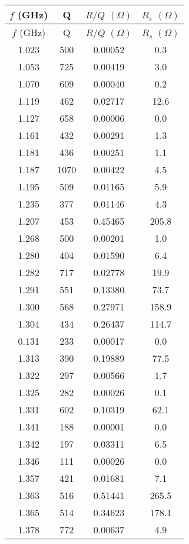 \begin{longtable}{c | c | c | c} 
\endfirsthead$f$ (GHz) & Q & $R/Q$ $(\Omega)$ & $R_{s}$ $(\Omega)$ \\
              \endhead$f$ (GHz) & Q & $R/Q$ $(\Omega)$ & $R_{s}$ $(\Omega)$ \\ \hline 
1.023 &  500 & 0.00052 &  0.3 \\ \hline 
1.053 &  725 & 0.00419 &  3.0 \\ \hline 
1.070 &  609 & 0.00040 &  0.2 \\ \hline 
1.119 &  462 & 0.02717 & 12.6 \\ \hline 
1.127 &  658 & 0.00006 &  0.0 \\ \hline 
1.161 &  432 & 0.00291 &  1.3 \\ \hline 
1.181 &  436 & 0.00251 &  1.1 \\ \hline 
1.187 & 1070 & 0.00422 &  4.5 \\ \hline 
1.195 &  509 & 0.01165 &  5.9 \\ \hline 
1.235 &  377 & 0.01146 &  4.3 \\ \hline 
1.207 &  453 & 0.45465 & 205.8 \\ \hline 
1.268 &  500 & 0.00201 &  1.0 \\ \hline 
1.280 &  404 & 0.01590 &  6.4 \\ \hline 
1.282 &  717 & 0.02778 & 19.9 \\ \hline 
1.291 &  551 & 0.13380 & 73.7 \\ \hline 
1.300 &  568 & 0.27971 & 158.9 \\ \hline 
1.304 &  434 & 0.26437 & 114.7 \\ \hline 
0.131 &  233 & 0.00017 &  0.0 \\ \hline 
1.313 &  390 & 0.19889 & 77.5 \\ \hline 
1.322 &  297 & 0.00566 &  1.7 \\ \hline 
1.325 &  282 & 0.00026 &  0.1 \\ \hline 
1.331 &  602 & 0.10319 & 62.1 \\ \hline 
1.341 &  188 & 0.00001 &  0.0 \\ \hline 
1.342 &  197 & 0.03311 &  6.5 \\ \hline 
1.346 &  111 & 0.00026 &  0.0 \\ \hline 
1.357 &  421 & 0.01681 &  7.1 \\ \hline 
1.363 &  516 & 0.51441 & 265.5 \\ \hline 
1.365 &  514 & 0.34623 & 178.1 \\ \hline 
1.378 &  772 & 0.00637 &  4.9 \\ \hline 

\end{longtable}
